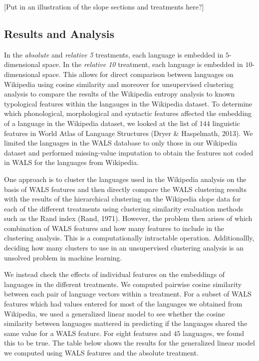 \documentclass[10pt, letterpaper]{article}
\begin{document}
{[}Put in an illustration of the slope sections and treatments here?{]}

\hypertarget{results-and-analysis}{%
\subsection{Results and Analysis}\label{results-and-analysis}}

In the \emph{absolute} and \emph{relative 5} treatments, each language
is embedded in \(5\)-dimensional space. In the \emph{relative 10}
treatment, each language is embedded in \(10\)-dimensional space. This
allows for direct comparison between languages on Wikipedia using cosine
similarity and moreover for unsupervised clustering analysis to compare
the results of the Wikipedia entropy analysis to known typological
features within the langauges in the Wikipedia dataset. To determine
which phonological, morphological and syntactic features affected the
embedding of a language in the Wikipedia dataset, we looked at the list
of \(144\) linguistic features in World Atlas of Language Structures
(Dryer \& Haspelmath, 2013). We limited the languages in the WALS
database to only those in our Wikipedia dataset and performed
missing-value imputation to obtain the features not coded in WALS for
the languages from Wikipedia.

One approach is to cluster the languages used in the Wikipedia analysis
on the basis of WALS features and then directly compare the WALS
clustering results with the results of the hierarchical clustering on
the Wikipedia slope data for each of the different treatments using
clustering similarity evaluation methods such as the Rand index (Rand,
1971). However, the problem then arises of which combination of WALS
features and how many features to include in the clustering analysis.
This is a computationally intractable operation. Additionallly, deciding
how many clusters to use in an unsupervised clustering analysis is an
unsolved problem in machine learning.

We instead check the effects of individual features on the embeddings of
languages in the different treatments. We computed pairwise cosine
similarity between each pair of language vectors within a treatment. For
a subset of WALS features which had values entered for most of the
languages we obtained from Wikipedia, we used a generalized linear model
to see whether the cosine similarity between languages mattered in
predicting if the languages shared the same value for a WALS feature.
For eight features and \(45\) languages, we found this to be true. The
table below shows the results for the generalized linear model we
computed using WALS features and the absolute treatment.
\end{document}

